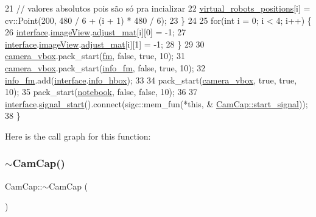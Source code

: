 \begin{DoxyCode}
21         \textcolor{comment}{// valores absolutos pois são só pra incializar}
22         \hyperlink{class_cam_cap_afdbec56c1e17c308441cf2eaad035e45}{virtual\_robots\_positions}[i] = cv::Point(200, 480 / 6 + (i + 1) * 480 / 6);
23     \}
24 
25     \textcolor{keywordflow}{for}(\textcolor{keywordtype}{int} i = 0; i < 4; i++) \{
26         \hyperlink{class_cam_cap_a58002893dfb61307042ddbba0c362dcd}{interface}.\hyperlink{class_v_s_s_s___g_u_i_1_1_v4_l_interface_a2c99f4d9fad8a34fa98d5b61beb06745}{imageView}.\hyperlink{class_image_view_a59c7771f6220f24b661c3ba8ea3b27f1}{adjust\_mat}[i][0] = -1;
27         \hyperlink{class_cam_cap_a58002893dfb61307042ddbba0c362dcd}{interface}.\hyperlink{class_v_s_s_s___g_u_i_1_1_v4_l_interface_a2c99f4d9fad8a34fa98d5b61beb06745}{imageView}.\hyperlink{class_image_view_a59c7771f6220f24b661c3ba8ea3b27f1}{adjust\_mat}[i][1] = -1;
28     \}
29 
30     \hyperlink{class_cam_cap_a4a00cd71f3f2ab88b985f53e527613fd}{camera\_vbox}.pack\_start(\hyperlink{class_cam_cap_ad0377b692fbf2edec6d8cc3dfdc65c2d}{fm}, \textcolor{keyword}{false}, \textcolor{keyword}{true}, 10);
31     \hyperlink{class_cam_cap_a4a00cd71f3f2ab88b985f53e527613fd}{camera\_vbox}.pack\_start(\hyperlink{class_cam_cap_a411c71ae763f50f8a8752bb9a6ddc4d1}{info\_fm}, \textcolor{keyword}{false}, \textcolor{keyword}{true}, 10);
32     \hyperlink{class_cam_cap_a411c71ae763f50f8a8752bb9a6ddc4d1}{info\_fm}.add(\hyperlink{class_cam_cap_a58002893dfb61307042ddbba0c362dcd}{interface}.\hyperlink{class_v_s_s_s___g_u_i_1_1_v4_l_interface_ae189e841cf752e3b018b2e0eb9f65ea7}{info\_hbox});
33 
34     pack\_start(\hyperlink{class_cam_cap_a4a00cd71f3f2ab88b985f53e527613fd}{camera\_vbox}, \textcolor{keyword}{true}, \textcolor{keyword}{true}, 10);
35     pack\_start(\hyperlink{class_cam_cap_acccac8a77e94926ef3d4a79bd9b94f56}{notebook}, \textcolor{keyword}{false}, \textcolor{keyword}{false}, 10);
36 
37     \hyperlink{class_cam_cap_a58002893dfb61307042ddbba0c362dcd}{interface}.\hyperlink{class_v_s_s_s___g_u_i_1_1_v4_l_interface_a43220e7911fcf933c7e2e702b703943e}{signal\_start}().connect(sigc::mem\_fun(*\textcolor{keyword}{this}, &
      \hyperlink{class_cam_cap_ae676e6624dd821ad494a80e68a41e249}{CamCap::start\_signal}));
38 \}
\end{DoxyCode}
Here is the call graph for this function\+:
\mbox{\label{class_cam_cap_a3d74911ae33294e1714a40fc02e7783d}} 
\subsubsection{\texorpdfstring{$\sim$\+Cam\+Cap()}{~CamCap()}}
{\footnotesize\ttfamily Cam\+Cap\+::$\sim$\+Cam\+Cap (\begin{DoxyParamCaption}{ }\end{DoxyParamCaption})}



